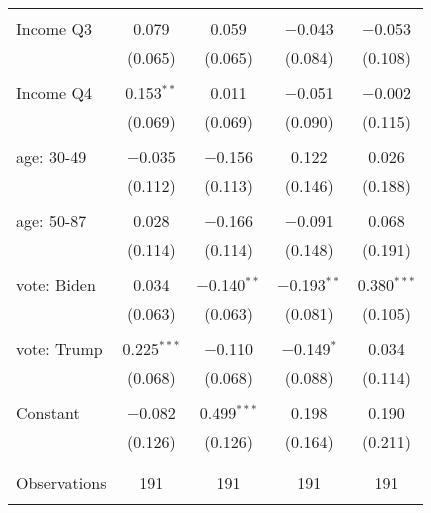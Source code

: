 \begin{tabular}{@{\extracolsep{5pt}}lcccc}
  & & & & \\ 
 Income Q3 & 0.079 & 0.059 & $-$0.043 & $-$0.053 \\ 
  & (0.065) & (0.065) & (0.084) & (0.108) \\ 
  & & & & \\ 
 Income Q4 & 0.153$^{**}$ & 0.011 & $-$0.051 & $-$0.002 \\ 
  & (0.069) & (0.069) & (0.090) & (0.115) \\ 
  & & & & \\ 
 age: 30-49 & $-$0.035 & $-$0.156 & 0.122 & 0.026 \\ 
  & (0.112) & (0.113) & (0.146) & (0.188) \\ 
  & & & & \\ 
 age: 50-87 & 0.028 & $-$0.166 & $-$0.091 & 0.068 \\ 
  & (0.114) & (0.114) & (0.148) & (0.191) \\ 
  & & & & \\ 
 vote: Biden & 0.034 & $-$0.140$^{**}$ & $-$0.193$^{**}$ & 0.380$^{***}$ \\ 
  & (0.063) & (0.063) & (0.081) & (0.105) \\ 
  & & & & \\ 
 vote: Trump & 0.225$^{***}$ & $-$0.110 & $-$0.149$^{*}$ & 0.034 \\ 
  & (0.068) & (0.068) & (0.088) & (0.114) \\ 
  & & & & \\ 
 Constant & $-$0.082 & 0.499$^{***}$ & 0.198 & 0.190 \\ 
  & (0.126) & (0.126) & (0.164) & (0.211) \\ 
  & & & & \\ 
\hline \\[-1.8ex] 

Observations & 191 & 191 & 191 & 191 \\ 
\hline 
\hline \\[-1.8ex] 
\end{tabular} 